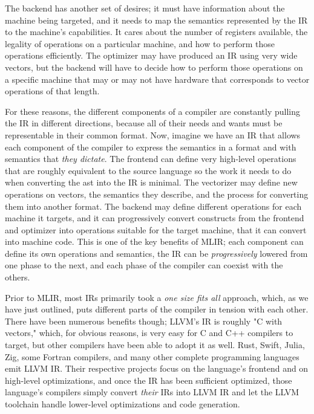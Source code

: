 The backend has another set of desires; it must have information about the
machine being targeted, and it needs to map the semantics represented by the IR
to the machine's capabilities. It cares about the number of registers available,
the legality of operations on a particular machine, and how to perform those operations efficiently.
The optimizer may have produced an IR using very wide vectors, but the
backend will have to decide how to perform those operations on a specific machine
that may or may not have hardware that corresponds to vector operations of that length.

For these reasons, the different components of a compiler are constantly pulling
the IR in different directions, because all of their needs and wants must be
representable in their common format.
Now, imagine we have an IR that allows each component of the compiler to express
the semantics in a format and with semantics that \textit{they dictate}.
The frontend can define very high-level operations that are roughly equivalent
to the source language so the work it needs to do when converting the \acrshort{ast}
into the IR is minimal.
The vectorizer may define new operations on vectors, the semantics they
describe, and the process for converting them into another format.
The backend may define different operations for each machine it targets,
and it can progressively convert constructs from the frontend and optimizer
into operations suitable for the target machine, that it can convert into
machine code.
This is one of the key benefits of MLIR; each component can define its own
operations and semantics, the IR can be \textit{progressively} lowered from
one phase to the next, and each phase of the compiler can coexist with the others.

Prior to MLIR, most IRs primarily took a \textit{one size fits all} approach,
which, as we have just outlined, puts different parts of the compiler in tension with each other.
There have been numerous benefits though; LLVM's IR is roughly "C with vectors,"
which, for obvious reasons, is very easy for C and C++ compilers to target,
but other compilers have been able to adopt it as well.
Rust, Swift, Julia, Zig, some Fortran compilers, and many other complete programming languages
emit LLVM IR. Their respective projects focus on the language's
frontend and on high-level optimizations, and once the IR has been sufficient
optimized, those language's compilers simply convert \textit{their} IRs into
LLVM IR and let the LLVM toolchain handle lower-level optimizations and code generation.

